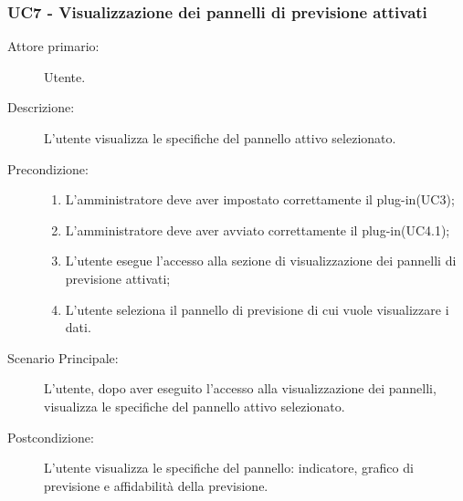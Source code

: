 \subsubsection{UC7 - Visualizzazione dei pannelli di previsione attivati}
\label{sssec:uc7}
\begin{description}
	\item[Attore primario:] Utente.
	\item[Descrizione:] L'utente visualizza le specifiche del pannello attivo selezionato.
	\item[Precondizione:]
	\begin{enumerate}
		\item L'amministratore deve aver impostato correttamente il plug-in(UC3);
		\item L'amministratore deve aver avviato correttamente il plug-in(UC4.1);
		\item L'utente esegue l'accesso alla sezione di visualizzazione dei pannelli di previsione attivati;
		\item L'utente seleziona il pannello di previsione di cui vuole visualizzare i dati.
	\end{enumerate}
	\item[Scenario Principale:] L'utente, dopo aver eseguito l'accesso alla visualizzazione dei pannelli, visualizza le specifiche del pannello attivo selezionato.
	\item[Postcondizione:] L'utente visualizza le specifiche del pannello: indicatore, grafico di previsione e affidabilità della previsione.
\end{description}
